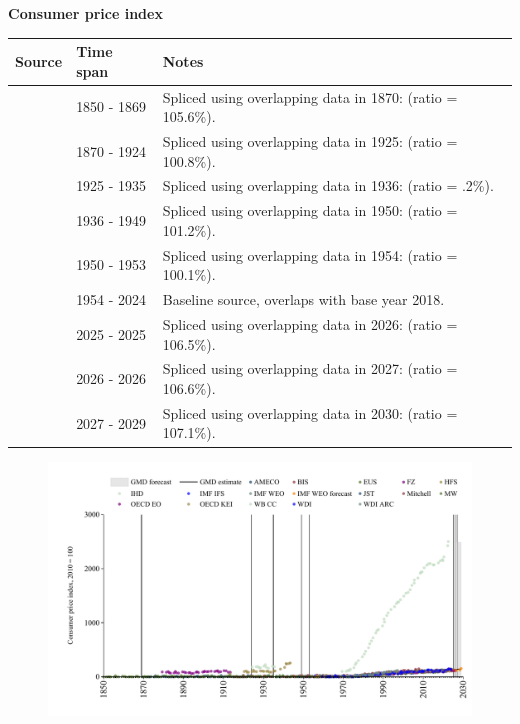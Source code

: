 \documentclass[12pt,a4paper,landscape]{article}
\begin{document}
\begin{adjustbox}{max totalsize={\paperwidth}{\paperheight},center}
\begin{minipage}[t][\textheight][t]{\textwidth}
\vspace*{0.5cm}
{}
\begin{center}
{\Large\bfseries Consumer price index}
\end{center}
\vspace{0.5cm}
\begin{table}[H]
\centering
\small
\begin{tabular}{|l|l|l|}
\hline
\textbf{Source} & \textbf{Time span} & \textbf{Notes} \\
\hline
\rowcolor{white}\cite{MW}& 1850 - 1869 &Spliced using overlapping data in 1870: (ratio = 105.6\%). \\
\rowcolor{lightgray}\cite{JST}& 1870 - 1924 &Spliced using overlapping data in 1925: (ratio = 100.8\%). \\
\rowcolor{white}\cite{IHD}& 1925 - 1935 &Spliced using overlapping data in 1936: (ratio = .2\%). \\
\rowcolor{lightgray}\cite{JST}& 1936 - 1949 &Spliced using overlapping data in 1950: (ratio = 101.2\%). \\
\rowcolor{white}\cite{IMF_IFS}& 1950 - 1953 &Spliced using overlapping data in 1954: (ratio = 100.1\%). \\
\rowcolor{lightgray}\cite{BIS}& 1954 - 2024 &Baseline source, overlaps with base year 2018. \\
\rowcolor{white}\cite{OECD_EO}& 2025 - 2025 &Spliced using overlapping data in 2026: (ratio = 106.5\%). \\
\rowcolor{lightgray}\cite{AMECO}& 2026 - 2026 &Spliced using overlapping data in 2027: (ratio = 106.6\%). \\
\rowcolor{white}\cite{IMF_WEO_forecast}& 2027 - 2029 &Spliced using overlapping data in 2030: (ratio = 107.1\%). \\
\hline
\end{tabular}
\end{table}
\begin{figure}[H]
\centering
\includegraphics[width=\textwidth,height=0.6\textheight,keepaspectratio]{graphs/ESP_CPI.pdf}
\end{figure}
\end{minipage}
\end{adjustbox}
\end{document}
